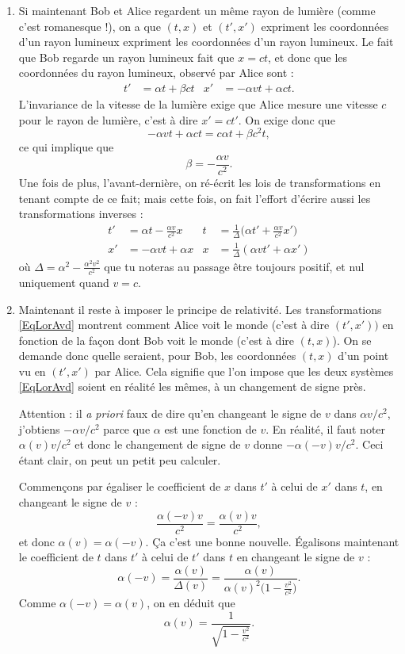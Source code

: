 \begin{enumerate}
\item Si maintenant Bob et Alice regardent un même rayon de lumière (comme c'est romanesque !), on a que $(t,x)$ et $(t',x')$ expriment les coordonnées d'un rayon lumineux expriment les coordonnées d'un rayon lumineux. Le fait que Bob regarde un rayon lumineux fait que $x=ct$, et donc que les coordonnées du rayon lumineux, observé par Alice sont :
\begin{align}
   t'&=\alpha t+\beta ct	&x'&=-\alpha v t+\alpha c t.
\end{align}
L'invariance de la vitesse de la lumière exige que Alice mesure une vitesse $c$ pour le rayon de lumière, c'est à dire $x'=ct'$. On exige donc que
\[ 
  -\alpha v t+\alpha ct=c\alpha t+\beta c^2t,
\]
ce qui implique que 
\[ 
  \beta=-\frac{ \alpha v }{ c^2 }.
\]
Une fois de plus, l'avant-dernière,  on ré-écrit les lois de transformations en tenant compte de ce fait; mais cette fois, on fait l'effort d'écrire aussi les transformations inverses :
\begin{align}	\label{EqLorAvd}
t'&=\alpha t-\frac{ \alpha v }{ c^2 }x		& t&=\frac{1}{ \Delta }\big( \alpha t'+\frac{ \alpha v }{ c^2 }x' \big)\\
x'&=-\alpha vt+\alpha x				& x&=\frac{1}{ \Delta }(\alpha v t'+\alpha x')
\end{align}
où $\Delta=\alpha^2-\frac{ \alpha^2 v^2 }{ c^2 }$ que tu noteras au passage être toujours positif, et nul uniquement quand $v=c$.

\item Maintenant il reste à imposer le principe de relativité. Les transformations \eqref{EqLorAvd} montrent comment Alice voit le monde (c'est à dire $(t',x'))$ en fonction de la façon dont Bob voit le monde (c'est à dire $(t,x)$). On se demande donc quelle seraient, pour Bob, les coordonnées $(t,x)$ d'un point vu en $(t',x')$ par Alice. Cela signifie que l'on impose que les deux systèmes \eqref{EqLorAvd} soient en réalité les mêmes, à un changement de signe près.

Attention : il \emph{a priori} faux de dire qu'en changeant le signe de $v$ dans $\alpha v/c^2$, j'obtiens $-\alpha v/c^2$ parce que $\alpha$ est une fonction de $v$. En réalité, il faut noter $\alpha(v)v/c^2$ et donc le changement de signe de $v$ donne $-\alpha(-v)v/c^2$. Ceci étant clair, on peut un petit peu calculer.

Commençons par égaliser le coefficient de $x$ dans $t'$ à celui de $x'$ dans $t$, en changeant le signe de $v$ :
\[ 
  \frac{ \alpha(-v)v }{ c^2 }=\frac{ \alpha(v)v }{ c^2 },
\]
 et donc $\alpha(v)=\alpha(-v)$. Ça c'est une bonne nouvelle. Égalisons maintenant le coefficient de $t$ dans $t'$ à celui de $t'$ dans $t$ en changeant le signe de $v$ :
\[ 
  \alpha(-v)=\frac{ \alpha(v) }{ \Delta(v) }=\frac{ \alpha(v) }{ \alpha(v)^2\big( 1-\frac{ v^2 }{ c^2 } \big) }.
\]
Comme $\alpha(-v)=\alpha(v)$, on en déduit que
\begin{equation}		\label{EqalphaLo}
\alpha(v)=\frac{1}{ \sqrt{1-\frac{ v^2 }{ c^2 }} }.
\end{equation}
\end{enumerate}

